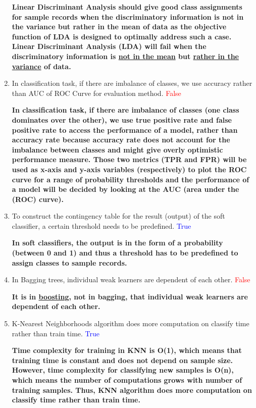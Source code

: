 \documentclass{homework}
\begin{document}
\begin{enumerate}
        \textbf{Linear Discriminant Analysis should give good class assignments for sample records when the discriminatory information is not in the variance but rather in the mean of data as the objective function of LDA is designed to optimally address such a case. Linear Discriminant Analysis (LDA) will fail when the discriminatory information is \underline{not in the mean} but \underline{rather in the variance} of data.}

        \item {In classification task, if there are imbalance of classes, we use accuracy rather than AUC of ROC Curve for evaluation method.} \textcolor{red}{False}
        
        \textbf{In classification task, if there are imbalance of classes (one class dominates over the other), we use true positive rate and false positive rate to access the performance of a model, rather than accuracy rate because accuracy rate does not account for the imbalance between classes and might give overly optimistic performance measure. Those two metrics (TPR and FPR) will be used as x-axis and y-axis variables (respectively) to plot the ROC curve  for a range of probability thresholds and the performance of a model will be decided by looking at the AUC (area under the (ROC) curve).}
        
        \item {To construct the contingency table for the result (output) of the soft classifier, a certain threshold needs to be predefined.} \textcolor{blue}{True}
        
        \textbf{In soft classifiers, the output is in the form of a probability (between 0 and 1) and thus a threshold has to be predefined to assign classes to sample records.} 
        
        \item {In Bagging trees, individual weak learners are dependent of each other.} \textcolor{red}{False}
        
        \textbf{It is in \underline{boosting}, not in bagging, that individual weak learners are dependent of each other.}
        
        \item {K-Nearest Neighborhoods algorithm does more computation on classify time rather than train time.}  \textcolor{blue}{True}
        
        \textbf{Time complexity for training in KNN is O(1), which means that training time is constant and does not depend on sample size. However, time complexity for classifying new samples is O(n), which means the number of computations grows with number of training samples. Thus, KNN algorithm does more computation on classify time rather than train time.}
        

\end{enumerate}
\end{document}
